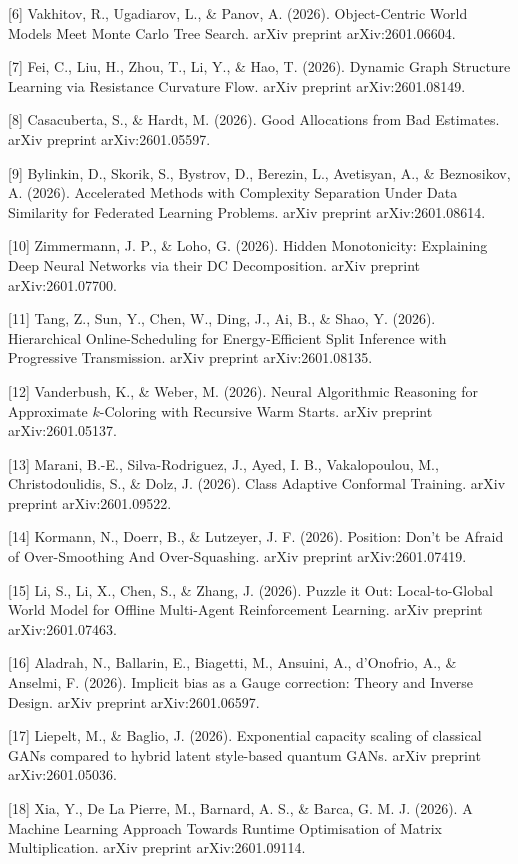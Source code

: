 [6] Vakhitov, R., Ugadiarov, L., & Panov, A. (2026). Object-Centric World Models Meet Monte Carlo Tree Search. arXiv preprint arXiv:2601.06604.

[7] Fei, C., Liu, H., Zhou, T., Li, Y., & Hao, T. (2026). Dynamic Graph Structure Learning via Resistance Curvature Flow. arXiv preprint arXiv:2601.08149.

[8] Casacuberta, S., & Hardt, M. (2026). Good Allocations from Bad Estimates. arXiv preprint arXiv:2601.05597.

[9] Bylinkin, D., Skorik, S., Bystrov, D., Berezin, L., Avetisyan, A., & Beznosikov, A. (2026). Accelerated Methods with Complexity Separation Under Data Similarity for Federated Learning Problems. arXiv preprint arXiv:2601.08614.

[10] Zimmermann, J. P., & Loho, G. (2026). Hidden Monotonicity: Explaining Deep Neural Networks via their DC Decomposition. arXiv preprint arXiv:2601.07700.

[11] Tang, Z., Sun, Y., Chen, W., Ding, J., Ai, B., & Shao, Y. (2026). Hierarchical Online-Scheduling for Energy-Efficient Split Inference with Progressive Transmission. arXiv preprint arXiv:2601.08135.

[12] Vanderbush, K., & Weber, M. (2026). Neural Algorithmic Reasoning for Approximate $k$-Coloring with Recursive Warm Starts. arXiv preprint arXiv:2601.05137.

[13] Marani, B.-E., Silva-Rodriguez, J., Ayed, I. B., Vakalopoulou, M., Christodoulidis, S., & Dolz, J. (2026). Class Adaptive Conformal Training. arXiv preprint arXiv:2601.09522.

[14] Kormann, N., Doerr, B., & Lutzeyer, J. F. (2026). Position: Don't be Afraid of Over-Smoothing And Over-Squashing. arXiv preprint arXiv:2601.07419.

[15] Li, S., Li, X., Chen, S., & Zhang, J. (2026). Puzzle it Out: Local-to-Global World Model for Offline Multi-Agent Reinforcement Learning. arXiv preprint arXiv:2601.07463.

[16] Aladrah, N., Ballarin, E., Biagetti, M., Ansuini, A., d'Onofrio, A., & Anselmi, F. (2026). Implicit bias as a Gauge correction: Theory and Inverse Design. arXiv preprint arXiv:2601.06597.

[17] Liepelt, M., & Baglio, J. (2026). Exponential capacity scaling of classical GANs compared to hybrid latent style-based quantum GANs. arXiv preprint arXiv:2601.05036.

[18] Xia, Y., De La Pierre, M., Barnard, A. S., & Barca, G. M. J. (2026). A Machine Learning Approach Towards Runtime Optimisation of Matrix Multiplication. arXiv preprint arXiv:2601.09114.

